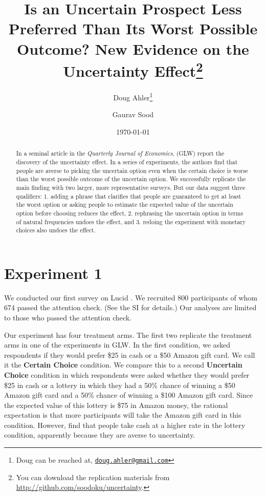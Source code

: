 \documentclass[12pt, letterpaper]{article}
\title{Is an Uncertain Prospect Less Preferred Than Its Worst Possible Outcome? New Evidence on the Uncertainty Effect\thanks{You can download the replication materials from \href{http://github.com/soodoku/uncertainty}{http://github.com/soodoku/uncertainty}.}}
\author{Doug Ahler\thanks{Doug can be reached at, \href{mailto:doug.ahler@gmail.com}{\footnotesize{\texttt{doug.ahler@gmail.com}}}} \and Gaurav Sood}
\date{\today}
\begin{document}
\maketitle

\thispagestyle{empty}
\begin{abstract}
\noindent In a seminal article in the \textit{Quarterly Journal of Economics}, \cite{gneezy2006uncertainty} (GLW) report the discovery of the uncertainty effect. In a series of experiments, the authors find that people are averse to picking the uncertain option even when the certain choice is worse than the worst possible outcome of the uncertain option. We successfully replicate the main finding with two larger, more representative surveys. But our data suggest three qualifiers: 1. adding a phrase that clarifies that people are guaranteed to get at least the worst option or asking people to estimate the expected value of the uncertain option before choosing reduces the effect, 2. rephrasing the uncertain option in terms of natural frequencies undoes the effect, and 3. redoing the experiment with monetary choices also undoes the effect.
\end{abstract} 
\clearpage
\setcounter{page}{1}
\doublespace

\section*{Experiment 1}

We conducted our first survey on Lucid \citep{coppock2019validating}. We recruited 800 participants of whom 674 passed the attention check. (See the SI for details.) Our analyses are limited to those who passed the attention check.

Our experiment has four treatment arms. The first two replicate the treatment arms in one of the experiments in GLW. In the first condition, we asked respondents if they would prefer \$25 in cash or a \$50 Amazon gift card. We call it the \textbf{Certain Choice} condition. We compare this to a second \textbf{Uncertain Choice} condition in which respondents were asked whether they would prefer \$25 in cash or a lottery in which they had a 50\% chance of winning a \$50 Amazon gift card and a 50\% chance of winning a \$100 Amazon gift card. Since the expected value of this lottery is \$75 in Amazon money, the rational expectation is that more participants will take the Amazon gift card in this condition. However, \cite{gneezy2006uncertainty} find that people take cash at a higher rate in the lottery condition, apparently because they are averse to uncertainty.
\end{document}
